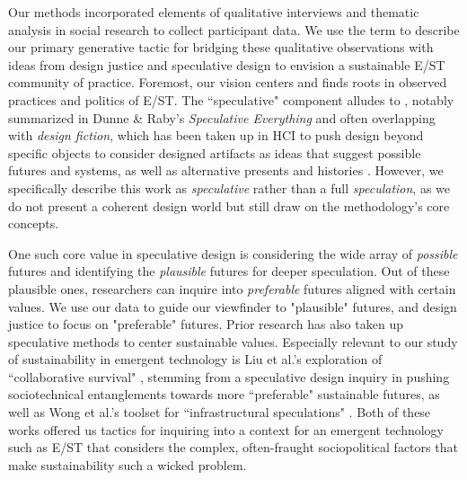 \documentclass[manuscript,review,anonymous]{acmart}
\begin{document}
Our methods incorporated elements of qualitative interviews \cite{braun_online_2020, fontana_interviewing_2007} and thematic analysis \cite{maguire_doing_2017, braun_using_2006} in social research to collect participant data.
We use the term  to describe our primary generative tactic for bridging these qualitative observations with ideas from design justice and speculative design to envision a sustainable E/ST community of practice. Foremost, our vision centers  \cite{costanza-chock_design_2020} and finds roots in observed practices and politics of E/ST. The ``speculative" component alludes to , notably summarized in Dunne \& Raby's \textit{Speculative Everything} \cite{dunne_speculative_2013} and often overlapping with \textit{design fiction}, which has been taken up in HCI to push design beyond specific objects to consider designed artifacts as ideas that suggest possible futures and systems, as well as alternative presents and histories \cite{akama_speculative_2016, baumann_infrastructures_2017, wakkary_sustainable_2013}. However, we specifically describe this work as \textit{speculative} rather than a full \textit{speculation}, as we do not present a coherent design world but still draw on the methodology's core concepts.

One such core value in speculative design is considering the wide array of \textit{possible} futures and identifying the \textit{plausible} futures for deeper speculation. Out of these plausible ones, researchers can inquire into \textit{preferable} futures aligned with certain values. We use our data to guide our viewfinder to "plausible" futures, and design justice to focus on "preferable" futures.
Prior research has also taken up speculative methods to center sustainable values. Especially relevant to our study of sustainability in emergent technology is Liu et al.'s exploration of ``collaborative survival" \cite{liu_design_2018}, stemming from a speculative design inquiry in pushing sociotechnical entanglements towards more ``preferable" sustainable futures, as well as Wong et al.'s toolset for ``infrastructural speculations" \cite{wong_infrastructural_2020}. Both of these works offered us tactics for inquiring into a context for an emergent technology such as E/ST that considers the complex, often-fraught sociopolitical factors that make sustainability such a wicked problem. 
\end{document}
